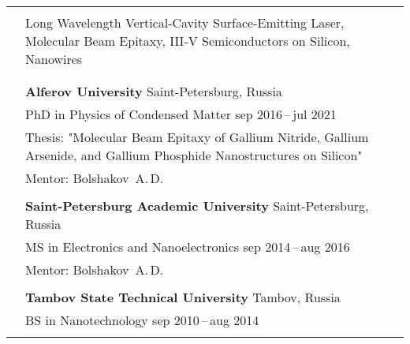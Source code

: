 \documentclass[letterpaper, 11pt]{article}
\begin{document}
	\begin{longtable}{p{1.3in}p{4.8in}}
		
		
		\nohyphens{\color{OliveGreen}{Research interests}} \\
        & Long Wavelength Vertical-Cavity Surface-Emitting Laser, Molecular
        Beam Epitaxy, III-V Semiconductors on Silicon, Nanowires \\
		& \\
		
		
		\color{OliveGreen}{Education} \\
        & \textbf{Alferov University} \hfill Saint-Petersburg, Russia \\
		& PhD in Physics of Condensed Matter \hfill sep 2016\,--\,jul 2021 \\
        & Thesis: "Molecular Beam Epitaxy of Gallium Nitride, Gallium Arsenide,
        and Gallium Phosphide Nanostructures on Silicon" \\
		& Mentor: Bolshakov~A.\,D.\\
		& \\
		
		& \textbf{Saint-Petersburg Academic University} \hfill Saint-Petersburg, Russia \\
		& MS in Electronics and Nanoelectronics \hfill sep 2014\,--\,aug 2016\\
		& Mentor: Bolshakov~A.\,D. \\
		& \\
		
		& \textbf{Tambov State Technical University} \hfill Tambov, Russia\\
		& BS in Nanotechnology \hfill sep 2010\,--\,aug 2014\\
		& \\
		
		
		

\end{longtable}
\end{document}

